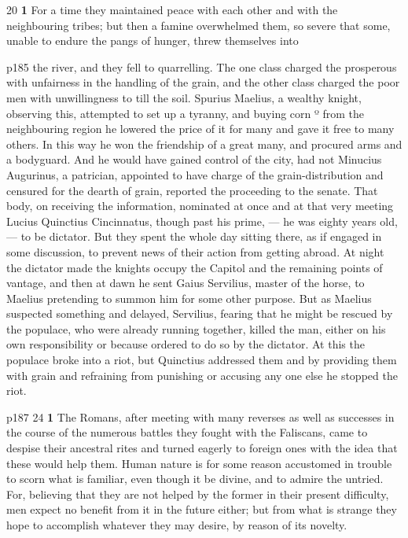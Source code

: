 20
\textbf{1} For a time they maintained peace with each other and with the neighbouring tribes; but then a famine overwhelmed them, so severe that some, unable to endure the pangs of hunger, threw themselves into

p185 the river, and they fell to quarrelling. The one class charged the prosperous with unfairness in the handling of the grain, and the other class charged the poor men with unwillingness to till the soil. Spurius Maelius, a wealthy knight, observing this, attempted to set up a tyranny, and buying corn º from the neighbouring region he lowered the price of it for many and gave it free to many others. In this way he won the friendship of a great many, and procured arms and a bodyguard. And he would have gained control of the city, had not Minucius Augurinus, a patrician, appointed to have charge of the grain-distribution and censured for the dearth of grain, reported the proceeding to the senate. That body, on receiving the information, nominated at once and at that very meeting Lucius Quinctius Cincinnatus, though past his prime, \texthebrew{—} he was eighty years old, \texthebrew{—} to be dictator. But they spent the whole day sitting there, as if engaged in some discussion, to prevent news of their action from getting abroad. At night the dictator made the knights occupy the Capitol and the remaining points of vantage, and then at dawn he sent Gaius Servilius, master of the horse, to Maelius pretending to summon him for some other purpose. But as Maelius suspected something and delayed, Servilius, fearing that he might be rescued by the populace, who were already running together, killed the man, either on his own responsibility or because ordered to do so by the dictator. At this the populace broke into a riot, but Quinctius addressed them and by providing them with grain and refraining from punishing or accusing any one else he stopped the riot.

p187
24
\textbf{1} The Romans, after meeting with many reverses as well as successes in the course of the numerous battles they fought with the Faliscans, came to despise their ancestral rites and turned eagerly to foreign ones with the idea that these would help them. Human nature is for some reason accustomed in trouble to scorn what is familiar, even though it be divine, and to admire the untried. For, believing that they are not helped by the former in their present difficulty, men expect no benefit from it in the future either; but from what is strange they hope to accomplish whatever they may desire, by reason of its novelty.

